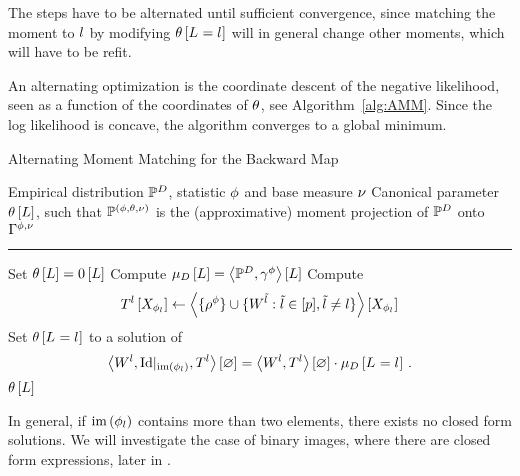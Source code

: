 The steps have to be alternated until sufficient convergence, since matching the moment to $l$ by modifying $\theta\left[L_{}=l_{}\right]$ will in general change other moments, which will have to be refit.

An alternating optimization is the coordinate descent of the negative likelihood, seen as a function of the coordinates of $\theta$, see Algorithm~\ref{alg:AMM}.
Since the log likelihood is concave, the algorithm converges to a global minimum.

\begin{algorithm}[h!]
    \caption{Alternating Moment Matching for the Backward Map}\label{alg:AMM}
    \begin{algorithmic}
        \Require Empirical distribution $\mathbb{P}^{D}$, statistic $\phi$ and base measure $\nu$
        \Ensure Canonical parameter $\theta\left[L\right]$, such that $\mathbb{P}^{(\phi,\theta,\nu)}$ is the (approximative) moment projection of $\mathbb{P}^{D}$ onto $\Gamma^{\phi,\nu}$
        \hrule
        \State Set $\theta\left[L\right]=0\left[L\right]$
        \State Compute $\mu_{D}\left[L\right]= \left\langle \mathbb{P}^{D},\gamma^{\phi}\right\rangle \left[ L \right]$
            \For{$\selindexin$}
                \State Compute
                \begin{align*}
                    T^{l}\left[X_{\phi_{l}}\right]
                    \leftarrow \left\langle \{\rho^{\phi}\}\cup\{W^{\tilde{l}} : \tilde{l} \in [p], \tilde{l}\neq l\}\right\rangle \left[ X_{\phi_{l}} \right]
                \end{align*}
                \State Set $\theta\left[L_{}=l_{}\right]$ to a solution of
                \begin{align*}
                    \left\langle W^{l},{\mathrm{Id}}|_{\mathrm{im}\left(\phi_{l}\right)},T^{l}\right\rangle \left[ \varnothing \right]
                    = \left\langle W^{l},T^{l}\right\rangle \left[ \varnothing \right] \cdot \mu_{D}\left[L_{}=l_{}\right] \, .
                \end{align*}
            \EndFor
        \EndWhile
        \Return $\theta\left[L\right]$
    \end{algorithmic}
\end{algorithm}


% 
In general, if $\mathrm{im}\left(\phi_{l}\right)$ contains more than two elements, there exists no closed form solutions.
We will investigate the case of binary images, where there are closed form expressions, later in .

